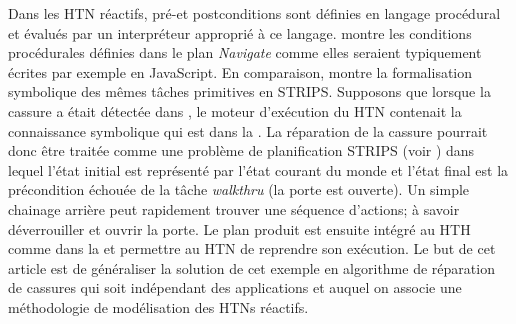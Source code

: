 \documentclass[a4paper,twoside,french]{article}
\begin{document}
	
		\par Dans les HTN réactifs, pré-et postconditions sont définies en langage  procédural et évalués par un interpréteur approprié à ce langage.   montre les  conditions procédurales définies dans le plan {\em Navigate} comme elles seraient typiquement écrites par exemple en JavaScript. 
		 En comparaison,  montre la formalisation symbolique  des mêmes tâches primitives en STRIPS. 
		Supposons que lorsque la cassure a était détectée dans , le moteur d'exécution du HTN  contenait la connaissance symbolique qui est dans la  . La réparation de la cassure pourrait donc être traitée comme une problème de planification STRIPS (voir ) dans lequel l'état initial est représenté par l'état courant du monde et l'état final est la précondition échouée de la tâche {\em walkthru} (la porte est ouverte). Un simple chainage arrière peut rapidement trouver une séquence d'actions; à savoir déverrouiller et ouvrir la porte. Le plan produit est ensuite intégré au HTH  comme dans la  et permettre au HTN de reprendre son exécution.  Le but de cet article est de généraliser la solution de cet exemple en algorithme de réparation de cassures qui soit indépendant des applications et auquel on associe une méthodologie de modélisation des HTNs réactifs.
		
\end{document}
